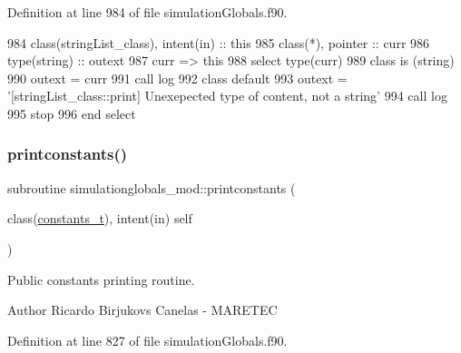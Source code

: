 Definition at line 984 of file simulation\+Globals.\+f90.


\begin{DoxyCode}
984     \textcolor{keywordtype}{class}(stringList\_class), \textcolor{keywordtype}{intent(in)} :: this
985     \textcolor{keywordtype}{class}(*), \textcolor{keywordtype}{pointer} :: curr
986     \textcolor{keywordtype}{type}(string) :: outext
987     curr => this%
988     \textcolor{keywordflow}{select type}(curr)
989 \textcolor{keywordflow}{    class is} (string)
990         outext = curr
991         \textcolor{keyword}{call }log%
992 \textcolor{keywordflow}{        class default}
993         outext = \textcolor{stringliteral}{'[stringList\_class::print] Unexepected type of content, not a string'}
994         \textcolor{keyword}{call }log%
995         stop
996 \textcolor{keywordflow}{    end select}
\end{DoxyCode}
\mbox{\label{namespacesimulationglobals__mod_a139cb36f8366e6aec875c7977235fd68}} 
\subsubsection{\texorpdfstring{printconstants()}{printconstants()}}
{\footnotesize\ttfamily subroutine simulationglobals\+\_\+mod\+::printconstants (\begin{DoxyParamCaption}\item[{class(\mbox{\hyperlink{structsimulationglobals__mod_1_1constants__t}{constants\+\_\+t}}), intent(in)}]{self }\end{DoxyParamCaption})\hspace{0.3cm}{\ttfamily [private]}}



Public constants printing routine. 

\begin{DoxyAuthor}{Author}
Ricardo Birjukovs Canelas -\/ M\+A\+R\+E\+T\+EC 
\end{DoxyAuthor}


Definition at line 827 of file simulation\+Globals.\+f90.


